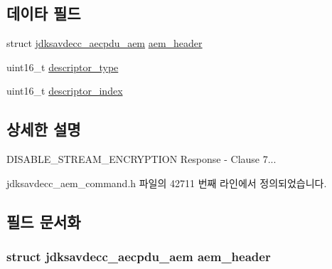 \subsection*{데이타 필드}
\begin{DoxyCompactItemize}
\item 
struct \hyperlink{structjdksavdecc__aecpdu__aem}{jdksavdecc\+\_\+aecpdu\+\_\+aem} \hyperlink{structjdksavdecc__aem__command__disable__stream__encryption__response_ae1e77ccb75ff5021ad923221eab38294}{aem\+\_\+header}
\item 
uint16\+\_\+t \hyperlink{structjdksavdecc__aem__command__disable__stream__encryption__response_ab7c32b6c7131c13d4ea3b7ee2f09b78d}{descriptor\+\_\+type}
\item 
uint16\+\_\+t \hyperlink{structjdksavdecc__aem__command__disable__stream__encryption__response_a042bbc76d835b82d27c1932431ee38d4}{descriptor\+\_\+index}
\end{DoxyCompactItemize}


\subsection{상세한 설명}
D\+I\+S\+A\+B\+L\+E\+\_\+\+S\+T\+R\+E\+A\+M\+\_\+\+E\+N\+C\+R\+Y\+P\+T\+I\+ON Response -\/ Clause 7... 

jdksavdecc\+\_\+aem\+\_\+command.\+h 파일의 42711 번째 라인에서 정의되었습니다.



\subsection{필드 문서화}
\subsubsection[{\texorpdfstring{aem\+\_\+header}{aem_header}}]{\setlength{\rightskip}{0pt plus 5cm}struct {\bf jdksavdecc\+\_\+aecpdu\+\_\+aem} aem\+\_\+header}\hypertarget{structjdksavdecc__aem__command__disable__stream__encryption__response_ae1e77ccb75ff5021ad923221eab38294}{}\label{structjdksavdecc__aem__command__disable__stream__encryption__response_ae1e77ccb75ff5021ad923221eab38294}


